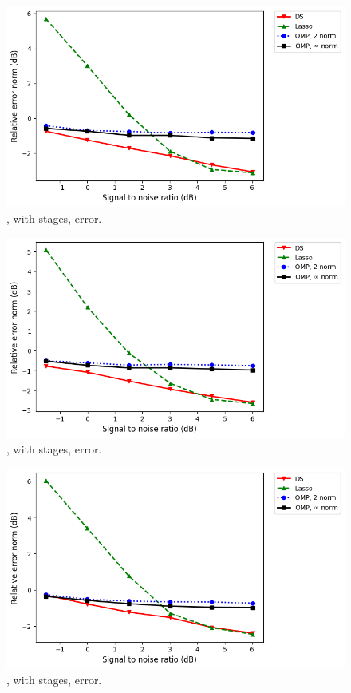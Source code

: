 %
\begin {figure} [H]
\includegraphics [width = \textwidth] {error-medium-more-square-nine-usual.png}
\caption {, with  stages, error.}
\end {figure}
%
\begin {figure} [H]
\includegraphics [width = \textwidth] {error-medium-more-wide-nine-usual.png}
\caption {, with  stages, error.}
\end {figure}
%
\begin {figure} [H]
\includegraphics [width = \textwidth] {error-medium-more-tall-nine-usual.png}
\caption {, with  stages, error.}
\end {figure}

